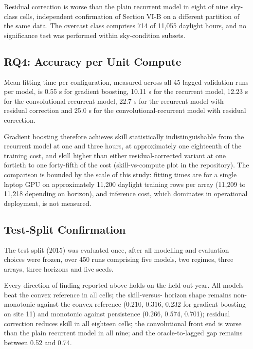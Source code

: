 Residual correction is worse than the plain recurrent model in eight of
nine sky-class cells, independent confirmation of Section VI-B on a
different partition of the same data. The overcast class comprises 714
of 11,055 daylight hours, and no significance test was performed within
sky-condition subsets.

\subsection{RQ4: Accuracy per Unit Compute}
\label{sec:rq4}

Mean fitting time per configuration, measured across all 45 lagged
validation runs per model, is 0.55 s for gradient boosting, 10.11 s for
the recurrent model, 12.23 s for the convolutional-recurrent model, 22.7
s for the recurrent model with residual correction and 25.0 s for the
convolutional-recurrent model with residual correction.

Gradient boosting therefore achieves skill statistically
indistinguishable from the recurrent model at one and three hours, at
approximately one eighteenth of the training cost, and skill higher than
either residual-corrected variant at one fortieth to one forty-fifth of
the cost (skill-vs-compute plot in the repository). The comparison is
bounded by the scale of this study: fitting times are for a single
laptop GPU on approximately 11,200 daylight training rows per array
(11,209 to 11,218 depending on horizon), and inference cost, which
dominates in operational deployment, is not measured.

\subsection{Test-Split Confirmation}
\label{sec:results-test-split}

The test split (2015) was evaluated once, after all modelling and
evaluation choices were frozen, over 450 runs comprising five models,
two regimes, three arrays, three horizons and five seeds.

Every direction of finding reported above holds on the held-out year.
All models beat the convex reference in all cells; the skill-versus-
horizon shape remains non-monotonic against the convex reference (0.210,
0.316, 0.232 for gradient boosting on site 11) and monotonic against
persistence (0.266, 0.574, 0.701); residual correction reduces skill in
all eighteen cells; the convolutional front end is worse than the plain
recurrent model in all nine; and the oracle-to-lagged gap remains
between 0.52 and 0.74.

